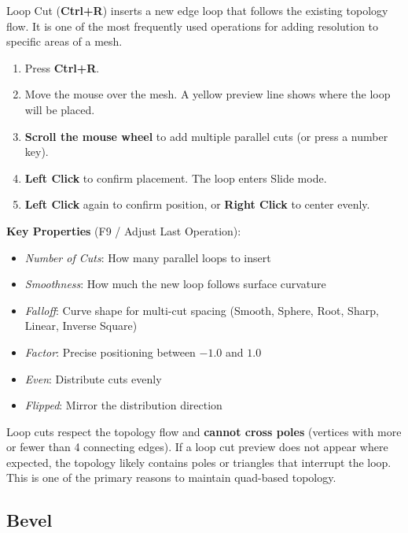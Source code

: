 Loop Cut (\textbf{Ctrl+R}) inserts a new edge loop that follows the existing topology flow. It is one of the most frequently used operations for adding resolution to specific areas of a mesh.

\begin{enumerate}[leftmargin=2em]
  \item Press \textbf{Ctrl+R}.
  \item Move the mouse over the mesh. A yellow preview line shows where the loop will be placed.
  \item \textbf{Scroll the mouse wheel} to add multiple parallel cuts (or press a number key).
  \item \textbf{Left Click} to confirm placement. The loop enters Slide mode.
  \item \textbf{Left Click} again to confirm position, or \textbf{Right Click} to center evenly.
\end{enumerate}

\textbf{Key Properties} (F9 / Adjust Last Operation):
\begin{itemize}[leftmargin=2em]
  \item \textit{Number of Cuts}: How many parallel loops to insert
  \item \textit{Smoothness}: How much the new loop follows surface curvature
  \item \textit{Falloff}: Curve shape for multi-cut spacing (Smooth, Sphere, Root, Sharp, Linear, Inverse Square)
  \item \textit{Factor}: Precise positioning between $-1.0$ and $1.0$
  \item \textit{Even}: Distribute cuts evenly
  \item \textit{Flipped}: Mirror the distribution direction
\end{itemize}

\begin{tipbox}
Loop cuts respect the topology flow and \textbf{cannot cross poles} (vertices with more or fewer than 4 connecting edges). If a loop cut preview does not appear where expected, the topology likely contains poles or triangles that interrupt the loop. This is one of the primary reasons to maintain quad-based topology.
\end{tipbox}

\subsection{Bevel}
\label{sec:bevel}

